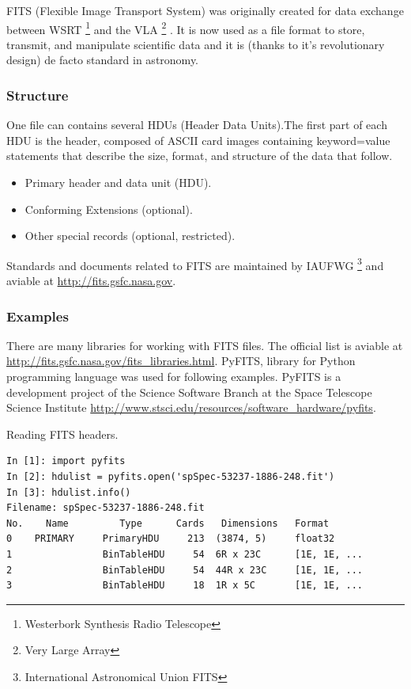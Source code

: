\bigskip

FITS (Flexible Image Transport System) was originally created for data
exchange between WSRT \footnote{Westerbork Synthesis Radio Telescope}
and the VLA \footnote{Very Large Array} \cite{fits1997}. It is now
used as a file format to store, transmit, and manipulate scientific
data and it is (thanks to it's revolutionary design) de facto standard
in astronomy.


\subsubsection*{Structure}

One file can contains several HDUs (Header Data Units).The first part
of each HDU is the header, composed of ASCII card images containing
\textrm{keyword=value} statements that describe the size, format, and
structure of the data that follow.

\begin{itemize}
\item Primary header and data unit (HDU).
\item Conforming Extensions (optional).
\item Other special records (optional, restricted).
\end{itemize}


Standards and documents related to FITS are maintained by IAUFWG
\footnote{International Astronomical Union FITS} and aviable at
\url{http://fits.gsfc.nasa.gov}.

\subsubsection*{Examples}

There are many libraries for working with FITS files. The official
list is aviable at
\url{http://fits.gsfc.nasa.gov/fits_libraries.html}. PyFITS, library
for Python programming language was used for following
examples. PyFITS is a development project of the Science Software
Branch at the Space Telescope Science Institute
\url{http://www.stsci.edu/resources/software_hardware/pyfits}.


Reading FITS headers.

\begin{lstlisting}
In [1]: import pyfits
In [2]: hdulist = pyfits.open('spSpec-53237-1886-248.fit')
In [3]: hdulist.info()
Filename: spSpec-53237-1886-248.fit
No.    Name         Type      Cards   Dimensions   Format
0    PRIMARY     PrimaryHDU     213  (3874, 5)     float32
1                BinTableHDU     54  6R x 23C      [1E, 1E, ...
2                BinTableHDU     54  44R x 23C     [1E, 1E, ...
3                BinTableHDU     18  1R x 5C       [1E, 1E, ...
\end{lstlisting}

